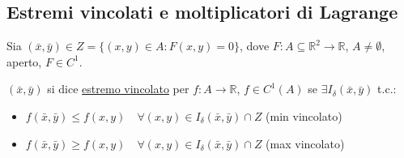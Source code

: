\subsection{Estremi vincolati e moltiplicatori di Lagrange}

\begin{definition}
Sia $(\bar{x}, \bar{y}) \in Z = \{ (x, y) \in A : F(x, y) = 0 \}$, dove $F : A \subseteq \mathbb{R}^2 \to \mathbb{R}$, $A \neq \emptyset$, aperto, $F \in C^1$.

$(\bar{x}, \bar{y})$ si dice \underline{estremo vincolato} per $f : A \to \mathbb{R}$, $f \in C^1(A)$  se $\exists I_\delta(\bar{x}, \bar{y})$ t.c.:
\begin{itemize}
    \item $f(\bar{x}, \bar{y}) \le f(x, y) \quad \forall (x, y) \in I_\delta(\bar{x}, \bar{y}) \cap Z$ \quad (min vincolato)
    \item $f(\bar{x}, \bar{y}) \ge f(x, y) \quad \forall (x, y) \in I_\delta(\bar{x}, \bar{y}) \cap Z$ \quad (max vincolato)
\end{itemize}
\begin{center}
\end{center}
\end{definition}

